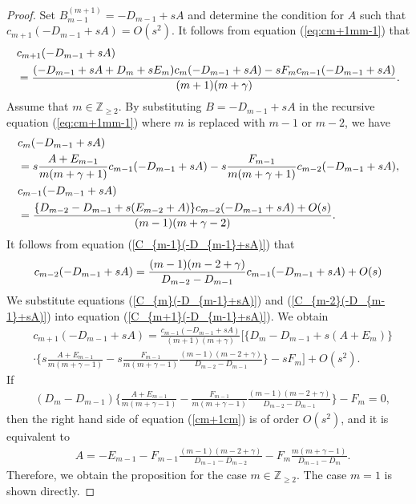 \documentclass[12pt]{amsart}
\newcommand{\Zint}{\mathbb {Z}}
\numberwithin{equation}{section}
\theoremstyle{definition}
\theoremstyle{remark}
\begin{document}
\begin{proof}
Set $B_{m-1}^{(m+1)}= -D_{m-1} + s A$ and determine the condition for $A$ such that $c_{m+1}(-D_{m-1} + s A )= O(s^2)$.
It follows from equation (\ref{eq:cm+1mm-1}) that
  \begin{align}
    & c_{m+1}(-D_{m-1}+sA) \label{C_{m+1}(-D_{m-1}+sA)} \\
    & =\frac{(-D_{m-1}+sA+D_{m}+sE_{m})c_{m}(-D_{m-1}+sA) - sF_{m}c_{m-1}(-D_{m-1}+sA)}{(m+1)(m+\gamma)} . \nonumber
  \end{align}
Assume that $m \in \Zint _{\geq 2} $.
By substituting $B= -D_{m-1}+sA$ in the recursive equation (\ref{eq:cm+1mm-1}) where $m$ is replaced with $m-1$ or $m-2$, we have
  \begin{align}
    & c_{m}(-D_{m-1}+sA) \label{C_{m}(-D_{m-1}+sA)} \\
    & = s\frac{A+E_{m-1}}{m(m+\gamma +1)}c_{m-1}(-D_{m-1}+sA)-s\frac{F_{m-1}}{m(m+\gamma+1)}c_{m-2}(-D_{m-1}+sA) , \nonumber \\
    & c_{m-1}(-D_{m-1}+sA) \label{C_{m-1}(-D_{m-1}+sA)} \\
    & = \frac{\{ D_{m-2} -D_{m-1}+s(E_{m-2}+A)\}c_{m-2}(-D_{m-1}+sA) + O(s)}{(m-1)(m+\gamma -2)} . \nonumber
  \end{align}
It follows from equation (\ref{C_{m-1}(-D_{m-1}+sA)}) that
  \begin{align}
    c_{m-2}(-D_{m-1}+sA)= \frac{(m-1)(m-2+\gamma)}{D_{m-2}-D_{m-1}}c_{m-1}(-D_{m-1}+sA)+O(s) \label{C_{m-2}(-D_{m-1}+sA)}
  \end{align}
We substitute equations (\ref{C_{m}(-D_{m-1}+sA)}) and (\ref{C_{m-2}(-D_{m-1}+sA)}) into equation (\ref{C_{m+1}(-D_{m-1}+sA)}).
We obtain
  \begin{align}
    &c_{m+1}(-D_{m-1}+sA) = \frac{c_{m-1}(-D_{m-1}+sA)}{(m+1)(m+\gamma)}\Big[ \{ D_{m} -D_{m-1}  +s(A+E_{m})\} \label{cm+1cm} \\ 
    &\cdot \Big\{ s\frac{A+E_{m-1}}{m(m+\gamma -1)} -s\frac{F_{m-1}}{m(m+\gamma -1)}\frac{(m-1)(m-2+\gamma)}{D_{m-2} -D_{m-1}} \Big\} -sF_{m} \Big] +O(s^2) . \nonumber 
  \end{align}
If 
  \begin{align}
&  (D_{m}-D_{m-1} )\Big\{  \frac{A+E_{m-1}}{m(m+\gamma -1)} -\frac{F_{m-1}}{m(m+\gamma -1)} \frac{(m-1)(m-2+\gamma)}{D_{m-2} -D_{m-1}} \Big\} -F_{m}= 0,
  \end{align}
then the right hand side of equation (\ref{cm+1cm}) is of order $O(s^2)$, and it is equivalent to
  \begin{align}
& A= -E_{m-1} -F_{m-1}\frac{(m-1)(m-2+\gamma)}{D_{m-1} -D_{m-2}} -F_{m}\frac{m(m +\gamma -1)}{D_{m-1} -D_{m}}.  \label{eq:A}
  \end{align}
Therefore, we obtain the proposition for the case $m \in \Zint _{\geq 2} $.
The case $m=1$ is shown directly.
\end{proof}
\end{document}
